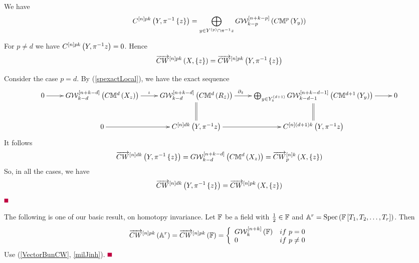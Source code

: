 \documentclass[12pt]{article}
\begin{document}
%
We have
$$
C^{\left[ n\right]pk}\left( Y, \pi^{-1}\left\{ z\right\}\right)= \bigoplus_{y\in Y^{\left( p\right)}\cap \pi^{-1}z} G{\mathcal{W}}_{k-p}^{\left[ n+k-p\right]}\left( C{\mathbb{M}}^{p}\left( Y_y\right)\right)
$$
\bE
\item %
For $p\neq d$
 we have $C^{\left[ n\right]{p}k}\left( Y, \pi^{-1}z\right)=0$. Hence
$$
\overrightarrow{CW}^{\left[ n\right]pk}\left( X, \left\{ z\right\}\right) = \overrightarrow{CW}^{\left[ n\right]pk}\left( Y, \pi^{-1}\left\{ z\right\}\right) 
$$
\item Consider the case $p=d$. %
By (\ref{spexactLocal}), we have the exact sequence
{
$$
\diagram 
0 \ar[r] &G{\CW}^{\LRt{n+k-d}}_{k-d}\LRf{C{\BM}^{d}\LRf{X_z}}
\ar[r]^{\iota} & G{\CW}_{k-d}^{\LRt{n+k-d}}\LRf{C{\BM}^{d}\LRf{R_{\tilde{z}}}}
\ar[r]^{\partial_{\tilde{z}}\qquad\qquad} & \bigoplus _{y\in Y_z^{\LRf{d+1}}}G{\CW}_{k-d-1}^{\LRt{n+k-d-1}}\LRf{C{\BM}^{d+1}\LRf{Y_y}}\ar[r] & 0\\
&%
0\ar[r] &C^{\LRt{n}dk}\LRf{Y, \pi^{-1}z}\ar@{=}[u]\ar[r]&C^{\LRt{n}(d+1)k}\LRf{Y, \pi^{-1}z}\ar@{=}[u]&\\
\enddiagram
$$ 
}
It follows
$$
 \overrightarrow{CW}^{\left[ n\right]dk}\left( Y, \pi^{-1}\left\{ z\right\}\right) =
G{\mathcal{W}}^{\left[ n+k-d\right]}_{k-d}\left( C{\mathbb{M}}^{d}\left( X_z\right)\right)=\overrightarrow{CW}^{\left[ n\right]k}_p\left( X, \left\{ z\right\}\right) 
$$
\eE 
So, in all the cases, we have
$$
 \overrightarrow{CW}^{\left[ n\right]dk}\left( Y, \pi^{-1}\left\{ z\right\}\right) =
\overrightarrow{CW}^{\left[ n\right]pk}\left( X, \left\{ z\right\}\right) 
$$
\pic $\eop$ 

\vspace{3mm}
The following is one of our basic result, on homotopy invariance.
\bC\label{ArKoChgp}{\rm 
Let ${\mathbb{F}}$ be a field with $\frac{1}{2} \in {\mathbb{F}}$ and ${\mathbb{A}}^r=\mathrm{Spec}\left({\mathbb{F}}\left[ T_1, T_2, \ldots, T_r\right]\right)$. Then 
$$
\ora{CW}^{\LRt{n}pk}\LRf{{\BA}^r} = \ora{CW}^{\LRt{n}pk}\LRf{{\BF}}= \LBrace{{ll}
G{\CW}_k^{\LRt{n+k}}\LRf{{\BF}} & if~p=0\\
0 & if ~p\neq 0\\
}%
$$
}
\eC
\pf Use (\ref{VectorBunCW}, \ref{milJinh}). 
$\eop$


\end{document}
